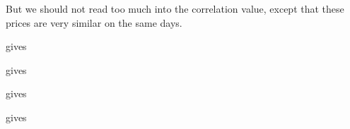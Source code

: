 \documentclass[a4paper,english,12pt]{article}
\begin{document}
But we should not read too much into the correlation value, except that these
prices are very similar on the same days.




\texttt{} gives
\texttt{}

\texttt{} gives
\texttt{}

 gives
\texttt{}

\texttt{} gives
\texttt{}

\end{document}
